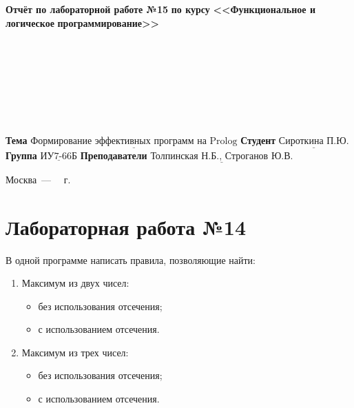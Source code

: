 \documentclass[12pt,a4paper]{scrreprt}
\begin{document}
\begin{titlepage}
	\begin{center}
		\noindent\begin{minipage}{1.3\textwidth}\centering
			\Large\textbf{  Отчёт по лабораторной работе №15}\newline
			\textbf{по курсу}\newline
			\textbf{<<Функциональное и логическое}\newline
			\textbf{\indent\indent\indent программирование>>}\newline
		\end{minipage}
	\end{center}
	
	~\\\\\\\\\\\\\\
	\normalsize
	\noindent\textbf{Тема } $\underline{\text{Формирование эффективных программ на Prolog}}$\newline\newline
	\noindent\textbf{Студент } $\underline{\text{Сироткина П.Ю.}}$\newline\newline
	\noindent\textbf{Группа } $\underline{\text{ИУ7-66Б}}$\newline\newline
	\noindent\textbf{Преподаватели } $\underline{\text{Толпинская Н.Б., Строганов Ю.В.}}$\newline
	
	\begin{center}
		\vfill
		Москва~---~\the\year
		~г.
	\end{center}
\end{titlepage}

\chapter*{Лабораторная работа №14}

В одной программе написать правила, позволяющие найти:

\begin{enumerate}
	\item Максимум из двух чисел:
	\begin{itemize}
		\item без использования отсечения;
		\item с использованием отсечения.
	\end{itemize}
	\item Максимум из трех чисел:
	\begin{itemize}
		\item без использования отсечения;
		\item с использованием отсечения.
	\end{itemize}
\end{enumerate}
\end{document}
